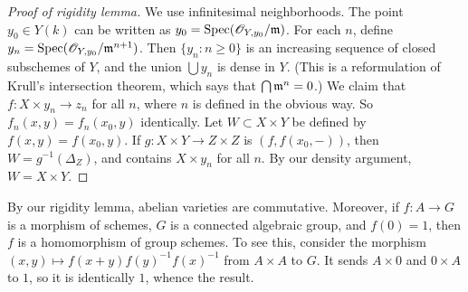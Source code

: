 \documentclass{article}
\begin{document}
\begin{proof}[Proof of rigidity lemma]
We use infinitesimal neighborhoods. The point $y_0\in Y(k)$ can be written 
as $y_0=\operatorname{Spec}(\mathscr{O}_{Y,y_0}/\mathfrak{m})$. For each $n$, define 
$y_n = \operatorname{Spec}(\mathscr{O}_{Y,y_0}/\mathfrak{m}^{n+1})$. Then $\{y_n:n\geqslant 0\}$ is 
an increasing sequence of closed subschemes of $Y$, and the union 
$\bigcup y_n$ is dense in $Y$. (This is a reformulation of Krull's 
intersection theorem, which says that $\bigcap \mathfrak{m}^n=0$.) We claim that 
$f:X\times y_n \to z_n$ for all $n$, where $n$ is defined in the obvious 
way.  So $f_n(x,y) = f_n(x_0,y)$ identically. Let 
$W\subset X\times Y$ be defined by $f(x,y) = f(x_0,y)$. If 
$g:X\times Y\to Z\times Z$ is $(f,f(x_0,-))$, then 
$W=g^{-1}(\Delta_Z)$, and contains $X\times y_n$ for all 
$n$. By our density argument, $W=X\times Y$. 
\end{proof}

By our rigidity lemma, abelian varieties are commutative. Moreover, if 
$f:A\to G$ is a morphism of schemes, $G$ is a connected algebraic group, 
and $f(0)=1$, then $f$ is a homomorphism of group schemes. To see this, 
consider the morphism $(x,y)\mapsto f(x+y) f(y)^{-1} f(x)^{-1}$ from 
$A\times A$ to $G$. It sends $A\times 0$ and $0\times A$ to $1$, so it is 
identically $1$, whence the result. 







\end{document}
